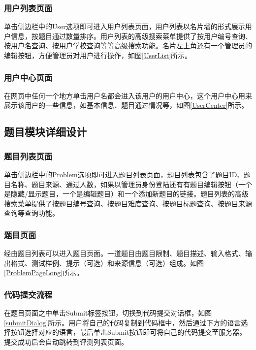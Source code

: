 \subsubsection{用户列表页面}
单击侧边栏中的User选项即可进入用户列表页面，用户列表以名片墙的形式展示用户信息，按题目通过数量排序。用户列表的高级搜索菜单提供了按用户编号查询、按用户名查询、按用户学校查询等等高级搜索功能。名片左上角还有一个管理员的编辑按钮，方便管理员对用户进行操作，如图\ref{UserList}所示。

\subsubsection{用户中心页面}
在网页中任何一个地方单击用户名都会进入该用户的用户中心，这个用户中心用来展示该用户的一些信息，如基本信息、题目通过情况等，如图\ref{UserCenter}所示。

\subsection{题目模块详细设计}
\subsubsection{题目列表页面}
单击侧边栏中的Problem选项即可进入题目列表页面，题目列表包含了题目ID、题目名称、题目来源、通过人数，如果以管理员身份登陆还有有题目编辑按钮（一个是隐藏/显示题目，一个是编辑题目）和一个添加新题目的链接。题目列表的高级搜索菜单提供了按题目编号查询、按题目难度查询、按题目标题查询、按题目来源查询等查询功能。


\subsubsection{题目页面}
经由题目列表可以进入题目页面。一道题目由题目限制、题目描述、输入格式、输出格式、测试样例、提示（可选）和来源信息（可选）组成。如图\ref{ProblemPageLong}所示。


\subsubsection{代码提交流程}
在题目页面之中单击Submit标签按钮，切换到代码提交对话框，如图\ref{submitDialog}所示。用户将自己的代码复制到代码框中，然后通过下方的语言选择按钮选择对应的语言，最后单击Submit按钮即可将自己的代码提交至服务器。提交成功后会自动跳转到评测列表页面。

